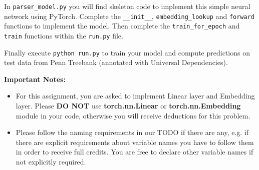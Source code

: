 \begin{parts}
    In \texttt{parser\_model.py} you will find skeleton code to implement this simple neural network using PyTorch. Complete the \texttt{\_\_init\_\_}, \texttt{embedding\_lookup} and \texttt{forward} functions to implement the model. Then complete the \texttt{train\_for\_epoch} and \texttt{train} functions within the \texttt{run.py} file.

    Finally execute \texttt{python run.py} to train your model and compute predictions
    on test data from Penn Treebank (annotated with Universal Dependencies).

    \textbf{Important Notes:}
    \begin{itemize}
        \item For this assignment, you are asked to implement Linear layer and Embedding layer. Please \textbf{DO NOT} use \textbf{torch.nn.Linear} or  \textbf{torch.nn.Embedding} module in your code, otherwise you will receive deductions for this problem.
        \item Please follow the naming requirements in our TODO if there are any, e.g. if there are explicit requirements about variable names you have to follow them in order to receive full credits. You are free to declare other variable names if not explicitly required.
    \end{itemize}


\end{parts}
